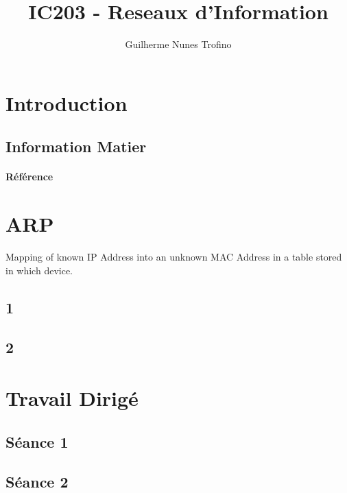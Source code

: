 \documentclass{article}
\title{IC203 - Reseaux d'Information}
\author{Guilherme Nunes Trofino}
\begin{document}
\maketitle


\newpage\tableofcontents

\section{Introduction}

% 
% 


\subsection{Information Matier}
\paragraph{Référence}



\section{ARP}
\begin{definition}
    Mapping of known IP Address into an unknown MAC Address in a table stored in which device.
\end{definition}


\subsection{1}

\subsection{2}

\section{Travail Dirigé}

\subsection{Séance 1}

\newpage\subsection{Séance 2}
\end{document}
